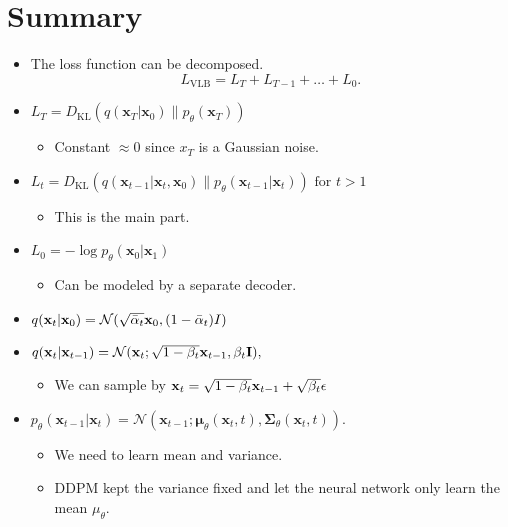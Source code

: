\section{Summary}
\begin{itemize}
	\item The loss function can be decomposed.
		$$L_\text{VLB} = L_T + L_{T-1} + \dots + L_0 .$$
	\item $L_T = D_\text{KL}(q(\mathbf{x}_T \vert \mathbf{x}_0) \parallel p_\theta(\mathbf{x}_T))$
		\begin{itemize}
			\item Constant $\approx 0$ since $x_T$ is a Gaussian noise.
		\end{itemize}
	\item $L_t = D_\text{KL}(q(\mathbf{x}_{t-1} \vert \mathbf{x}_{t}, \mathbf{x}_0) \parallel p_\theta(\mathbf{x}_{t-1} \vert\mathbf{x}_{t})) \text{ for } t>1 $
		\begin{itemize}
			\item This is the main part.
		\end{itemize}
	\item $L_0 = - \log p_\theta(\mathbf{x}_0 \vert \mathbf{x}_1)$
		\begin{itemize}
			\item Can be modeled by a separate decoder.
		\end{itemize}
	\item $q({\mathbf{x}}_t|{\mathbf{x}}_0) = \mathcal{N}(\sqrt{\bar{\alpha}_t}{\mathbf{x}}_0, (1-\bar{\alpha}_t)I )$
	\item $q({\mathbf{x}}_t \vert {\mathbf{x}}_{t-1}) = \mathcal{N}(\mathbf{x}_t; \sqrt{1 - \beta_t}{\mathbf{x}}_{t-1}, \beta_t\mathbf{I}),$
		\begin{itemize}
			\item[] We can sample by ${\mathbf{x}}_t=\sqrt{1 - \beta_t}{\mathbf{x}}_{t-1}+ \sqrt{\beta_t}\epsilon$
		\end{itemize}
	\item $p_\theta(\mathbf{x}_{t-1} \vert \mathbf{x}_t) = \mathcal{N}(\mathbf{x}_{t-1}; \boldsymbol{\mu}_\theta(\mathbf{x}_t, t), \boldsymbol{\Sigma}_\theta(\mathbf{x}_t, t))$.
		\begin{itemize}
			\item We need to learn mean and variance.
			\item DDPM kept the variance fixed and let the neural network only learn the mean $\mu_\theta$.

\end{itemize}
\end{itemize}
